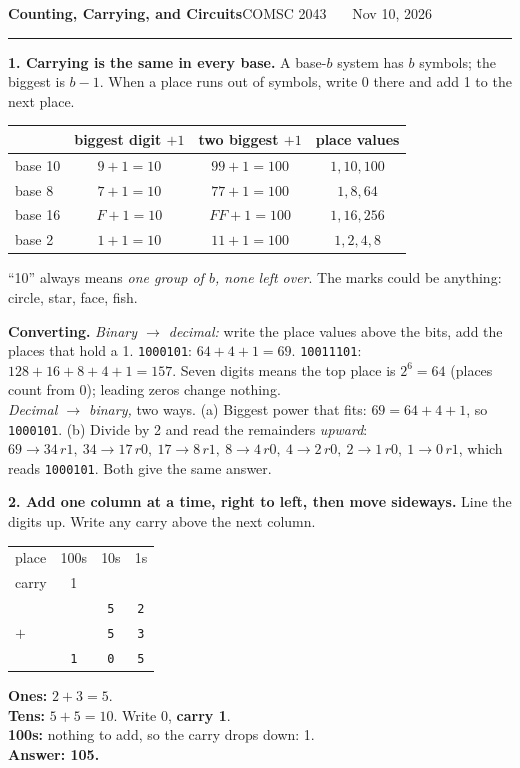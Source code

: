\documentclass[10pt,letterpaper]{article}
\renewcommand{\arraystretch}{1.05}
\begin{document}
{\Large\textbf{Counting, Carrying, and Circuits}}\hfill COMSC 2043 \ \textbullet\ \ Nov 10, 2026\\
\rule{\textwidth}{0.6pt}

\textbf{1. Carrying is the same in every base.} A base-$b$ system has $b$ symbols; the biggest is $b-1$. When a place runs out of symbols, write 0 there and add 1 to the next place.
\begin{center}
\begin{tabular}{l|ccc}
& \textbf{biggest digit $+1$} & \textbf{two biggest $+1$} & \textbf{place values}\\\hline
base 10 & $9+1=10$ & $99+1=100$ & $1,10,100$\\
base 8 & $7+1=10$ & $77+1=100$ & $1,8,64$\\
base 16 & $F+1=10$ & $FF+1=100$ & $1,16,256$\\
base 2 & $1+1=10$ & $11+1=100$ & $1,2,4,8$
\end{tabular}
\end{center}
``10'' always means \emph{one group of $b$, none left over}. The marks could be anything: circle, star, face, fish.

{\small\textbf{Converting.} \emph{Binary $\to$ decimal:} write the place values above the bits, add the places that hold a 1. \texttt{1000101}: $64+4+1=69$. \texttt{10011101}: $128+16+8+4+1=157$. Seven digits means the top place is $2^6=64$ (places count from 0); leading zeros change nothing.\\
\emph{Decimal $\to$ binary,} two ways. (a) Biggest power that fits: $69=64+4+1$, so \texttt{1000101}. (b) Divide by 2 and read the remainders \emph{upward}: $69\to34\,r1,\ 34\to17\,r0,\ 17\to8\,r1,\ 8\to4\,r0,\ 4\to2\,r0,\ 2\to1\,r0,\ 1\to0\,r1$, which reads \texttt{1000101}. Both give the same answer.}

\textbf{2. Add one column at a time, right to left, then move sideways.} Line the digits up. Write any carry above the next column.
\newcommand{\gc}[1]{\textcolor{black!60}{\footnotesize #1}}
\begin{center}
\renewcommand{\arraystretch}{1.15}
{\Large\begin{tabular}{@{}l@{\ \ }c@{\ \ }c@{\ \ }c@{}}
\gc{place} & \gc{100s} & \gc{10s} & \gc{1s}\\
\gc{carry} & \gc{1} & & \\
 & & \texttt{5} & \texttt{2}\\
$+$ & & \texttt{5} & \texttt{3}\\\hline
 & \texttt{1} & \texttt{0} & \texttt{5}
\end{tabular}}
\qquad
\begin{minipage}[c]{0.36\textwidth}\small
\textbf{Ones:} $2+3=5$.\\
\textbf{Tens:} $5+5=10$. Write 0, \textbf{carry 1}.\\
\textbf{100s:} nothing to add, so the carry drops down: 1.\\
\textbf{Answer: 105.}
\end{minipage}
\end{center}
\end{document}
